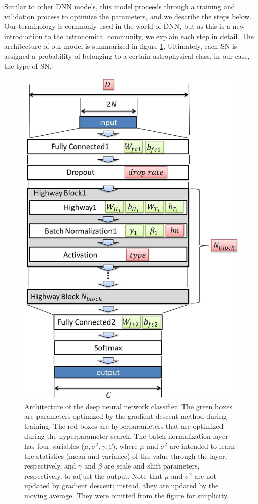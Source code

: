 \documentclass[proof]{pasj01}
\providecommand{\DIFdelend}{\protect\color{black}} %
\DeclareRobustCommand{\DIFdelend}{\DIFOaddend \let\includegraphics\DIFOincludegraphics} %
\begin{document}
\DIFdelend Similar to other DNN models, this model proceeds through a training and validation process to optimize the parameters, and we describe the steps below. Our terminology is commonly used in the world of DNN, but as this is a new introduction to the astronomical community, we explain each step in detail. The architecture of our model is summarized in figure \ref{fig:dnn_model}.
Ultimately, each SN is assigned a probability of belonging to a certain astrophysical class, in our case, the type of SN. 
%
\begin{figure}[htbp]
  \begin{center}
     \includegraphics[width=130mm]{figures/model_all.eps}
  \end{center}
  \caption{\label{dnnmodel}
  Architecture of the deep neural network classifier. 
  The green boxes are parameters optimized by the gradient descent method during training. The red boxes are hyperparameters that are optimized during the hyperparameter search. 
  The batch normalization layer has four variables ($\mu, \sigma^2, \gamma, \beta$), where $\mu$ and $\sigma^2$ are intended to learn the statistics (mean and variance) of the value through the layer, respectively, and $\gamma$ and $\beta$ are scale and shift parameters, respectively, to adjust the output. Note that $\mu$ and $\sigma^2$ are not updated by gradient descent; instead, they are updated by the moving average. They were omitted from the figure for simplicity.
  }%
  \label{fig:dnn_model}
\end{figure}
\end{document}
